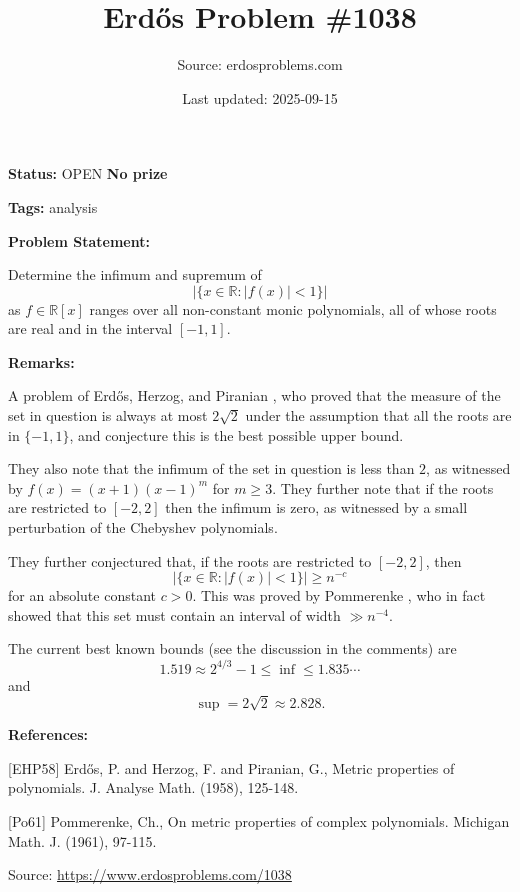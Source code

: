 \documentclass{article}
\title{Erd\H{o}s Problem \#1038}
\date{Last updated: 2025-09-15}
\author{Source: erdosproblems.com}
\begin{document}
\maketitle

\noindent\textbf{Status:} OPEN \quad \textbf{No prize}

\noindent\textbf{Tags:} analysis

\medskip
\noindent\textbf{Problem Statement:}

Determine the infimum and supremum of\[\lvert \{ x\in \mathbb{R} : \lvert f(x)\rvert < 1\}\rvert\]as $f\in \mathbb{R}[x]$ ranges over all non-constant monic polynomials, all of whose roots are real and in the interval $[-1,1]$.

\bigskip
\noindent\textbf{Remarks:}

A problem of Erd\H{o}s, Herzog, and Piranian \cite{EHP58}, who proved that the measure of the set in question is always at most $2\sqrt{2}$ under the assumption that all the roots are in $\{-1,1\}$, and conjecture this is the best possible upper bound.

They also note that the infimum of the set in question is less than $2$, as witnessed by $f(x)=(x+1)(x-1)^m$ for $m\geq 3$. They further note that if the roots are restricted to $[-2,2]$ then the infimum is zero, as witnessed by a small perturbation of the Chebyshev polynomials. 

They further conjectured that, if the roots are restricted to $[-2,2]$, then\[\lvert \{ x\in \mathbb{R} : \lvert f(x)\rvert < 1\}\rvert\geq n^{-c}\]for an absolute constant $c>0$. This was proved by Pommerenke \cite{Po61}, who in fact showed that this set must contain an interval of width $\gg n^{-4}$.

The current best known bounds (see the discussion in the comments) are\[1.519\approx 2^{4/3}-1\leq \inf \leq 1.835\cdots\]and\[\sup = 2\sqrt{2}\approx 2.828.\]

\bigskip
\noindent\textbf{References:}

[EHP58] Erd\H{o}s, P. and Herzog, F. and Piranian, G., Metric properties of polynomials. J. Analyse Math. (1958), 125-148.
 
 [Po61] Pommerenke, Ch., On metric properties of complex polynomials. Michigan Math. J. (1961), 97-115.

\bigskip
\noindent\small{Source: \url{https://www.erdosproblems.com/1038}}
\end{document}
